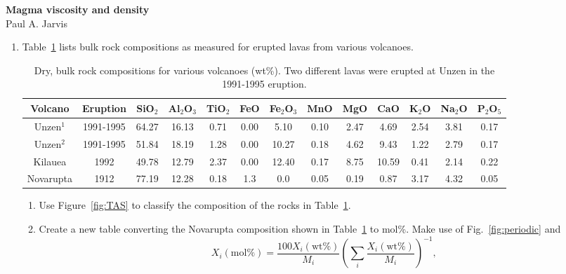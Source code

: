 \documentclass[]{book}
\theoremstyle{definition}
\begin{document}
\begin{center}
{\textbf{Magma viscosity and density}}\\
Paul A. Jarvis\\ %
\end{center}

\vspace{0.2 cm}


\begin{enumerate}
\item Table~\ref{tab:comp} lists bulk rock compositions as measured for erupted lavas from various volcanoes. 

  \begin{table}[h!]
    \centering
    \caption{Dry, bulk rock compositions for various volcanoes (wt\%). Two different lavas were erupted at Unzen in the 1991-1995 eruption. \label{tab:comp}}
    \begin{tabular}{|c|c|c c c c c c c c c c c|}
      \hline
      Volcano & Eruption & SiO$_{2}$ & Al$_{2}$O$_{3}$ & TiO$_{2}$ & FeO & Fe$_{2}$O$_{3}$ & MnO & MgO & CaO & K$_{2}$O & Na$_{2}$O & P$_{2}$O$_{5}$ \\
      \hline
      Unzen$^{1}$ & 1991-1995 & 64.27 & 16.13 & 0.71 & 0.00 & 5.10 & 0.10 & 2.47 & 4.69 & 2.54 & 3.81 & 0.17 \\
      Unzen$^{2}$ & 1991-1995 & 51.84 & 18.19 & 1.28 & 0.00 & 10.27 & 0.18 & 4.62 & 9.43 & 1.22 & 2.79 & 0.17 \\
      Kilauea & 1992 & 49.78 & 12.79 & 2.37 & 0.00 & 12.40 & 0.17 & 8.75 & 10.59 & 0.41 & 2.14 & 0.22 \\
      Novarupta & 1912 & 77.19 & 12.28 & 0.18 & 1.3 & 0.0 & 0.05 & 0.19 & 0.87 & 3.17 & 4.32 & 0.05 \\
      \hline
    \end{tabular}
  \end{table}

  \begin{enumerate}
  \item Use Figure~\ref{fig:TAS} to classify the composition of the rocks in Table~\ref{tab:comp}. 
  \item Create a new table converting the Novarupta composition shown in Table~\ref{tab:comp} to mol\%. Make use of Fig.~\ref{fig:periodic} and
    \begin{equation}
      \label{equ:wt2mol}
      X_{i}(\text{mol\%}) = \frac{100 X_{i}(\text{wt\%})}{M_{i}} \left(\sum_{i} \frac{X_{i}(\text{wt\%})}{M_{i}}\right)^{-1},
    \end{equation}
    


\end{enumerate}
\end{enumerate}
\end{document}
